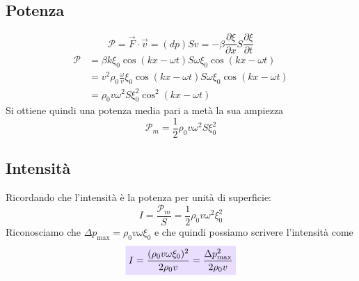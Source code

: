 \documentclass[x11names]{report}
\newcommand{\viola}[1]{\colorbox{yred}{$\displaystyle #1$}}
\begin{document}
	\subsection{Potenza}
	\[ 
	\mathcal{P} = \overrightarrow{F}\cdot \vec{v} = (dp)S v = -\beta \frac{\partial\xi}{\partial x} S \frac{\partial\xi}{\partial t}
	\]
	\begin{align*}
		\mathcal{P} &= \beta k \xi_0 \cos\left(kx- \omega t\right) S \omega  \xi_0 \cos\left(kx- \omega t\right)\\
		&= v^2\rho_0 \frac{\omega}{v} \xi_0 \cos\left(kx- \omega t\right) S \omega \xi_0 \cos\left(kx- \omega t\right)\\
		&=  \rho_0 v \omega ^2 S \xi_0^2 \cos^2\left(kx- \omega t\right) 
	\end{align*}
	Si ottiene quindi una potenza media pari a metà la sua ampiezza
	\[ 
	\mathcal{P}_m = \frac{1}{2} \rho_0 v \omega ^2 S \xi_0^2
	\]
	\subsection{Intensità}
	Ricordando che l'intensità è la potenza per unità di superficie:
	\[ 
	I = \frac{\mathcal{P}_m }{S} =   \frac{1}{2} \rho_0 v \omega ^2 \xi_0^2
	\]
	Riconosciamo che \(\Delta p_{\text{max}} = \rho_0 v \omega  \xi_0\) e che quindi possiamo scrivere l'intensità come
	\begin{equation}\label{intensita_fono}
		\viola{I = \frac{(\rho_0 v \omega  \xi_0)^2}{2\rho_0 v} = \frac{\Delta p_{\text{max}}^2}{2\rho_0 v}}
	\end{equation}
	
\end{document}
